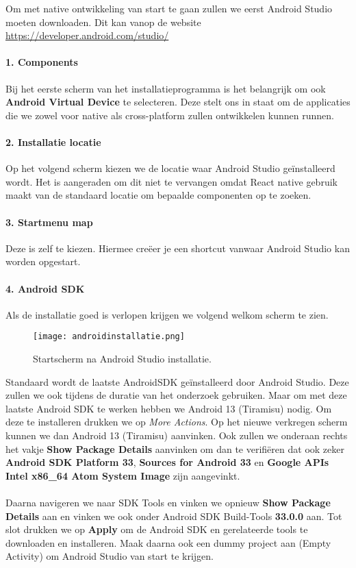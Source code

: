 Om met native ontwikkeling van start te gaan zullen we eerst Android Studio moeten downloaden. 
Dit kan vanop de website \url{https://developer.android.com/studio/}

\paragraph{1. Components}
Bij het eerste scherm van het installatieprogramma is het belangrijk om ook 
\textbf{Android Virtual Device} te selecteren. Deze stelt ons in staat om de applicaties die we 
zowel voor native als cross-platform zullen ontwikkelen kunnen runnen. 

\paragraph{2. Installatie locatie}
Op het volgend scherm kiezen we de locatie waar Android Studio geïnstalleerd wordt. 
Het is aangeraden om dit niet te vervangen omdat React native gebruik maakt van de standaard 
locatie om bepaalde componenten op te zoeken. 

\paragraph{3. Startmenu map}
Deze is zelf te kiezen. Hiermee creëer je een shortcut vanwaar Android Studio kan worden opgestart.

\paragraph{4. Android SDK}\label{par:sdk}
Als de installatie goed is verlopen krijgen we volgend welkom scherm te zien. 
\begin{figure}[H]
    \centering
    \texttt{[image: androidinstallatie.png]}
    \caption{Startscherm na Android Studio installatie.}
\end{figure}
Standaard wordt de laatste \gls{AndroidSDK} geïnstalleerd door Android Studio. 
Deze zullen we ook tijdens de duratie van het onderzoek gebruiken. 
Maar om met deze laatste Android SDK te werken hebben we Android 13 (Tiramisu) nodig. 
Om deze te installeren drukken we op \textit{More Actions}. Op het nieuwe verkregen scherm 
kunnen we dan Android 13 (Tiramisu) aanvinken. Ook zullen we onderaan rechts het vakje 
\textbf{Show Package Details} aanvinken om dan te verifiëren dat ook zeker 
\textbf{Android SDK Platform 33}, \textbf{Sources for Android 33} en 
\textbf{Google APIs Intel x86\_64 Atom System Image} zijn aangevinkt.
\\\\
Daarna navigeren we naar SDK Tools en vinken we opnieuw \textbf{Show Package Details} 
aan en vinken we ook onder Android SDK Build-Tools \textbf{33.0.0} aan. 
Tot slot drukken we op \textbf{Apply} om de Android SDK en gerelateerde tools te downloaden en installeren. 
Maak daarna ook een dummy project aan (Empty Activity) om Android Studio van start te krijgen.

